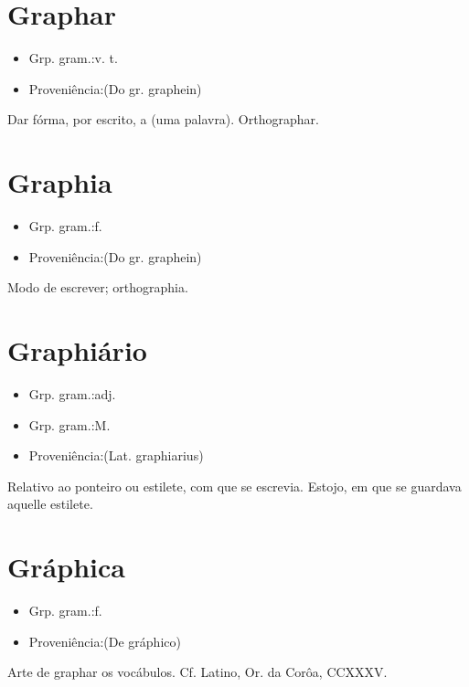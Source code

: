 \section{Graphar}
\begin{itemize}
\item {Grp. gram.:v. t.}
\end{itemize}
\begin{itemize}
\item {Proveniência:(Do gr. \textunderscore graphein\textunderscore )}
\end{itemize}
Dar fórma, por escrito, a (uma palavra).
Orthographar.
\section{Graphia}
\begin{itemize}
\item {Grp. gram.:f.}
\end{itemize}
\begin{itemize}
\item {Proveniência:(Do gr. \textunderscore graphein\textunderscore )}
\end{itemize}
Modo de escrever; orthographia.
\section{Graphiário}
\begin{itemize}
\item {Grp. gram.:adj.}
\end{itemize}
\begin{itemize}
\item {Grp. gram.:M.}
\end{itemize}
\begin{itemize}
\item {Proveniência:(Lat. \textunderscore graphiarius\textunderscore )}
\end{itemize}
Relativo ao ponteiro ou estilete, com que se escrevia.
Estojo, em que se guardava aquelle estilete.
\section{Gráphica}
\begin{itemize}
\item {Grp. gram.:f.}
\end{itemize}
\begin{itemize}
\item {Proveniência:(De \textunderscore gráphico\textunderscore )}
\end{itemize}
Arte de graphar os vocábulos. Cf. Latino, \textunderscore Or. da Corôa\textunderscore , CCXXXV.

